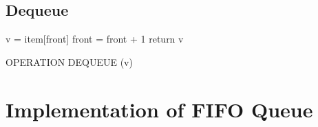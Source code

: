 \subsection{Dequeue}
\begin{center}
    \begin{algorithm}[H]
        \SetAlgoLined
        \large
        v = item[front]\; 
        front = front + 1\; 
        return v\; 
        \caption{OPERATION DEQUEUE (v)}
    \end{algorithm}
\end{center}    


\section{Implementation of  FIFO Queue}

